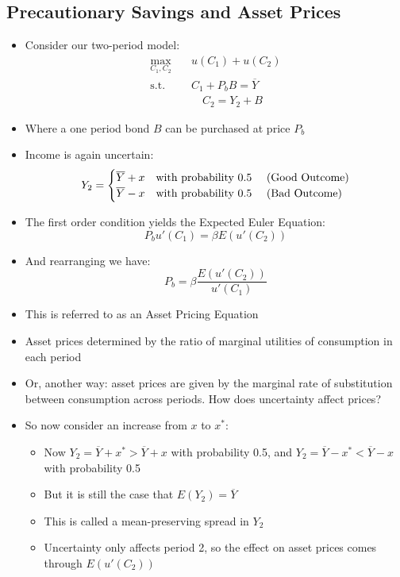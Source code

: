 \documentclass[a4paper]{article}
\begin{document}
\subsection{Precautionary Savings and Asset Prices}
	\begin{itemize}
		\item Consider our two-period model:
		\begin{align*}
			\max_{C_1,C_2}\quad &u(C_1) + u(C_2) \\
			\text{s.t.}\quad &C_1 + P_b B = \overline{Y} \\
			&\quad C_2 = Y_2 + B
		\end{align*}
		\item Where a one period bond \( B \) can be purchased at price \( P_b \)
		\item Income is again uncertain:
		\[
			Y_2 =
			\begin{cases}
				\overline{Y} + x & \text{with probability 0.5 \quad (Good Outcome)} \\
				\overline{Y} - x & \text{with probability 0.5 \quad (Bad Outcome)}
			\end{cases}
		\]
		\item The first order condition yields the Expected Euler Equation:
		\[
			P_b u'(C_1) = \beta E (u'(C_2))
		\]
		\item And rearranging we have:
		\[
			P_b = \beta \frac{E(u'(C_2))}{u'(C_1)}
		\]
		\item This is referred to as an \textcolor{myblue}{Asset Pricing Equation}
		\item Asset prices determined by the ratio of marginal utilities of consumption in each period
		\item Or, another way: asset prices are given by the marginal rate of substitution between consumption across periods. \textcolor{myblue}{How does uncertainty affect prices?}
		\item So now consider an increase from \( x \) to \( x^* \):
		\begin{itemize}
			\item Now \( Y_2 = \overline{Y} + x^* > \overline{Y} + x \) with probability 0.5, and \( Y_2 = \overline{Y} - x^* < \overline{Y} - x \) with probability 0.5
			\item But it is still the case that \( E(Y_2) = \overline{Y} \)
			\item This is called a \textcolor{myblue}{mean-preserving spread} in \( Y_2 \)
			\item Uncertainty only affects period 2, so the effect on asset prices comes through  \( E(u'(C_2)) \)
		\end{itemize}
	\end{itemize}
\end{document}
